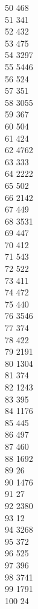 { 50	468 \\
 51	341 \\
 52	432 \\
 53	475 \\
 54	3297 \\
 55	5446 \\
 56	524 \\
 57	351 \\
 58	3055 \\
 59	367 \\
 60	504 \\
 61	424 \\
 62	4762 \\
 63	333 \\
 64	2222 \\
 65	502 \\
 66	2142 \\
 67	449 \\
 68	3531 \\
 69	447 \\
 70	412 \\
 71	543 \\
 72	522 \\
 73	411 \\
 74	472 \\
 75	440 \\
 76	3546 \\
 77	374 \\
 78	422 \\
 79	2191 \\
 80	1304 \\
 81	374 \\
 82	1243 \\
 83	395 \\
 84	1176 \\
 85	445 \\
 86	497 \\
 87	460 \\
 88	1692 \\
 89	26 \\
 90	1476 \\
 91	27 \\
 92	2380 \\
 93	12 \\
 94	3268 \\
 95	372 \\
 96	525 \\
 97	396 \\
 98	3741 \\
 99	1791 \\
 100	24 \\
}
